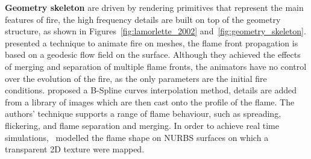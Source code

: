\textbf{Geometry skeleton} are driven by rendering primitives that represent the main features of fire, the high frequency details are built on top of the geometry structure, as shown in Figures~\ref{fig:lamorlette_2002} and~\ref{fig:geometry_skeleton}.
\cite{Lee:2001} presented a technique to animate fire on meshes, the flame front propagation is based on a geodesic flow field on the surface.
Although they achieved the effects of merging and separation of multiple flame fronts, the animators have no control over the evolution of the fire, as the only parameters are the initial fire conditions.
\cite{Lamorlette:2002} proposed a B-Spline curves interpolation method, details are added from a library of images which are then cast onto the profile of the flame.
The authors' technique supports a range of flame behaviour, such as spreading, flickering, and flame separation and merging.
In order to achieve real time simulations,~\cite{Bridault:2006} modelled the flame shape on NURBS surfaces on which a transparent 2D texture were mapped.

